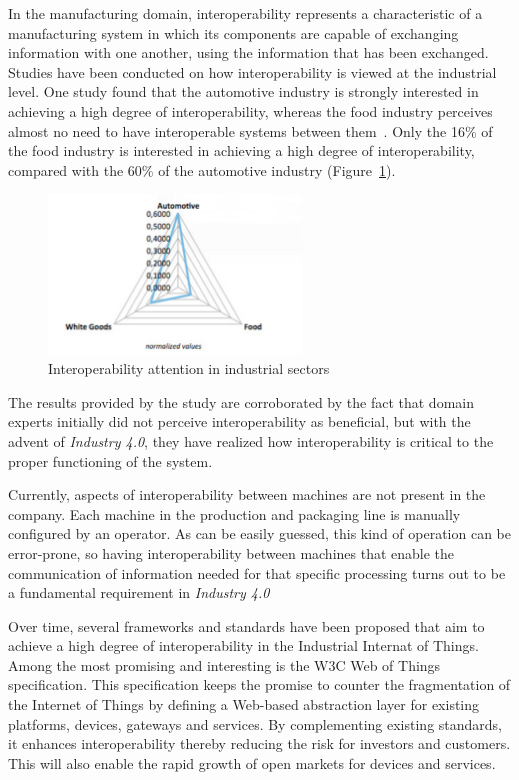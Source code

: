 In the manufacturing domain, interoperability represents a characteristic of a manufacturing system in which its components are capable of exchanging information with one another, using the information that has been exchanged.
Studies have been conducted on how interoperability is viewed at the industrial level. One study found that the automotive industry is strongly interested in achieving a high degree of interoperability, whereas the food industry perceives almost no need to have interoperable systems between them~\cite{LIAO201712434}. Only the 16\% of the food industry is interested in achieving a high degree of interoperability, compared with the 60\% of the automotive industry (Figure~\ref{fig:interoperability}).

\begin{figure}[h]
	\centering
	\includegraphics[width=0.6\textwidth]{img/interoperability.png}
	\caption{Interoperability attention in industrial sectors}
	\label{fig:interoperability}
\end{figure}

The results provided by the study are corroborated by the fact that domain experts initially did not perceive interoperability as beneficial, but
with the advent of \textit{Industry 4.0}, they have realized how interoperability is critical to the proper functioning of the system.

Currently, aspects of interoperability between machines are not present in the company.
Each machine in the production and packaging line is manually configured by an operator.
As can be easily guessed, this kind of operation can be error-prone, so having interoperability between machines that enable the communication of
information needed for that specific processing turns out to be a fundamental requirement in \textit{Industry 4.0}

Over time, several frameworks and standards have been proposed that aim to achieve a high degree of interoperability in the Industrial Internat of
Things. Among the most promising and interesting is the W3C Web of Things specification.
This specification keeps the promise to counter the fragmentation of the Internet of Things by defining a Web-based abstraction layer for existing
platforms, devices, gateways and services.
By complementing existing standards, it enhances interoperability thereby reducing the risk for investors and customers.
This will also enable the rapid growth of open markets for devices and services.

